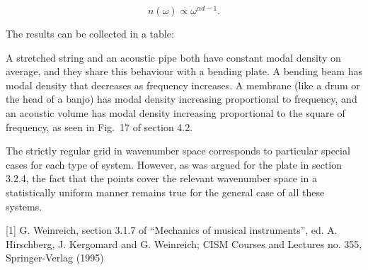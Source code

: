   $$n(\omega) \propto \omega^{\alpha d -1} . \tag{3}$$ 

  The results can be collected in a table: 

  A stretched string and an acoustic pipe both have constant modal density on 
  average, and they share this behaviour with a bending plate. A bending beam 
  has modal density that decreases as frequency increases. A membrane (like a 
  drum or the head of a banjo) has modal density increasing proportional to 
  frequency, and an acoustic volume has modal density increasing proportional 
  to the square of frequency, as seen in Fig.\ 17 of section 4.2. 

  The strictly regular grid in wavenumber space corresponds to particular 
  special cases for each type of system. However, as was argued for the plate 
  in section 3.2.4, the fact that the points cover the relevant wavenumber 
  space in a statistically uniform manner remains true for the general case of 
  all these systems. 

  \sectionreferences{}[1] G. Weinreich, section 3.1.7 of ``Mechanics of musical 
  instruments'', ed. A. Hirschberg, J. Kergomard and G. Weinreich; CISM Courses 
  and Lectures no. 355, Springer-Verlag (1995) 